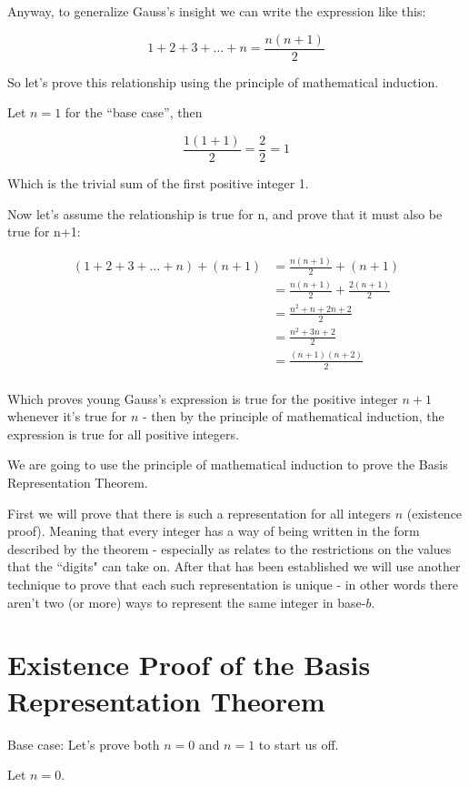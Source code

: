 \documentclass{article}
\begin{document}
\break
Anyway,
to generalize Gauss's insight we can write the expression like this:

\[1+2+3+\ldots+n=\frac{n(n+1)}{2}\]

So let's prove this relationship using the principle of mathematical induction.
\bigskip

Let $n=1$ for the ``base case'',
then

\[\frac{1(1+1)}{2}=\frac{2}{2}=1\]

Which is the trivial sum of the first positive integer 1.
\bigskip

Now let's assume the relationship is true for n,
and prove that it must also be true for n+1:

\begin{align*}
(1+2+3+\ldots+n) + (n+1) &=  \frac{n(n+1)}{2} + (n+1)\\
&= \frac{n(n+1)}{2} + \frac{2(n+1)}{2}\\
&= \frac{n^2+n+2n+2}{2}\\
&= \frac{n^2+3n+2}{2}\\
&= \frac{(n+1)(n+2)}{2}\\
\end{align*}

Which proves young Gauss's expression is true for the positive integer $n+1$ whenever it's true for $n$ - then
by the principle of mathematical induction, the expression is true for all positive integers.
\bigskip

We are going to use the principle of mathematical induction to prove the Basis Representation Theorem.

First we will prove that there is such a representation for all integers $n$ (existence proof).
Meaning that every integer has a way of being written in the form described by the theorem - especially as relates to the restrictions on the values that the ``digits" can take on.
After that has been established we will use another technique to prove that each such representation is unique - in other words there aren't two (or more) ways to represent the same integer in base-$b$.

\break
\section*{Existence Proof of the Basis Representation Theorem}

Base case:
Let’s prove both $n=0$ and $n=1$ to start us off.

Let $n=0$.
\end{document}
